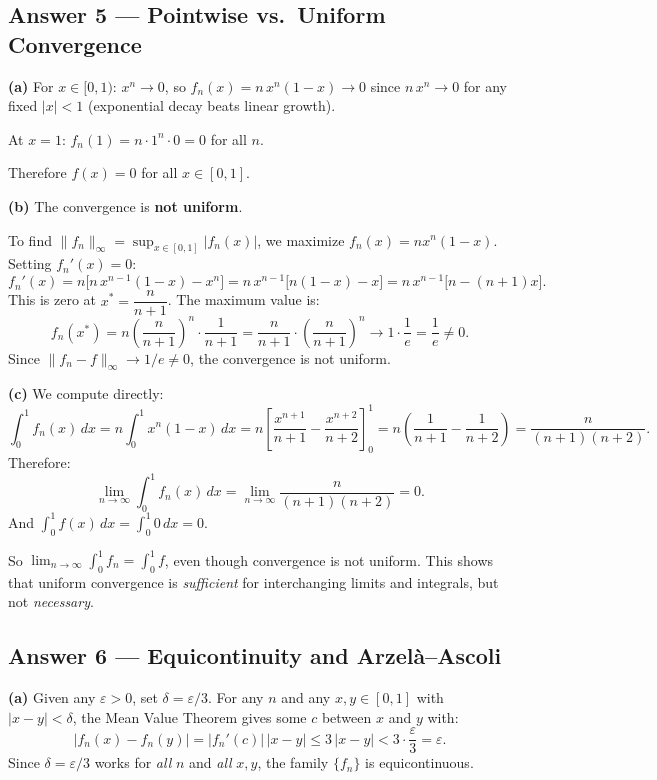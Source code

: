\documentclass[10pt]{article}
\newcommand{\eps}{\varepsilon}
\begin{document}
\subsection{Answer 5 --- Pointwise vs.\ Uniform Convergence}

\textbf{(a)} For $x \in [0,1)$: $x^n \to 0$, so $f_n(x) = n\,x^n(1-x) \to 0$ since $n\,x^n \to 0$ for any fixed $|x| < 1$ (exponential decay beats linear growth).

At $x = 1$: $f_n(1) = n \cdot 1^n \cdot 0 = 0$ for all $n$.

Therefore $f(x) = 0$ for all $x \in [0,1]$.

\medskip

\textbf{(b)} The convergence is \textbf{not uniform}.

To find $\|f_n\|_\infty = \sup_{x \in [0,1]} |f_n(x)|$, we maximize $f_n(x) = nx^n(1-x)$. Setting $f_n'(x) = 0$:
$$
f_n'(x) = n\bigl[n\,x^{n-1}(1-x) - x^n\bigr] = n\,x^{n-1}\bigl[n(1-x) - x\bigr] = n\,x^{n-1}\bigl[n - (n+1)x\bigr].
$$
This is zero at $x^* = \dfrac{n}{n+1}$. The maximum value is:
$$
f_n(x^*) = n \left(\frac{n}{n+1}\right)^n \cdot \frac{1}{n+1} = \frac{n}{n+1} \cdot \left(\frac{n}{n+1}\right)^n \to 1 \cdot \frac{1}{e} = \frac{1}{e} \neq 0.
$$
Since $\|f_n - f\|_\infty \to 1/e \neq 0$, the convergence is not uniform.

\medskip

\textbf{(c)} We compute directly:
$$
\int_0^1 f_n(x)\,dx = n\int_0^1 x^n(1-x)\,dx = n\left[\frac{x^{n+1}}{n+1} - \frac{x^{n+2}}{n+2}\right]_0^1 = n\left(\frac{1}{n+1} - \frac{1}{n+2}\right) = \frac{n}{(n+1)(n+2)}.
$$
Therefore:
$$
\lim_{n \to \infty} \int_0^1 f_n(x)\,dx = \lim_{n \to \infty} \frac{n}{(n+1)(n+2)} = 0.
$$
And $\displaystyle\int_0^1 f(x)\,dx = \int_0^1 0\,dx = 0$.

So $\displaystyle\lim_{n\to\infty}\int_0^1 f_n = \int_0^1 f$, even though convergence is not uniform. This shows that uniform convergence is \emph{sufficient} for interchanging limits and integrals, but not \emph{necessary}.

\subsection{Answer 6 --- Equicontinuity and Arzel\`a--Ascoli}

\textbf{(a)} Given any $\eps > 0$, set $\delta = \eps/3$. For any $n$ and any $x, y \in [0,1]$ with $|x - y| < \delta$, the Mean Value Theorem gives some $c$ between $x$ and $y$ with:
$$
|f_n(x) - f_n(y)| = |f_n'(c)|\,|x - y| \leq 3\,|x - y| < 3 \cdot \frac{\eps}{3} = \eps.
$$
Since $\delta = \eps/3$ works for \emph{all} $n$ and \emph{all} $x, y$, the family $\{f_n\}$ is equicontinuous.
\end{document}
